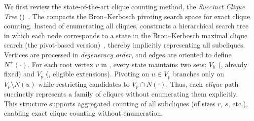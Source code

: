 We first review the state-of-the-art clique counting method, the \textit{Succinct Clique Tree} (\sct)~\cite{Pivoter}. 
The \sct compacts the Bron--Kerbosch pivoting search space for exact clique counting. 
Instead of enumerating all cliques, \sct constructs a hierarchical search tree in which each node corresponds to a state in the Bron--Kerbosch maximal clique search (the pivot-based version)~\cite{BronKerbosch,bitsetClique}, thereby implicitly representing all subcliques. 
Vertices are processed in \textit{degeneracy order}, and edges are oriented to define $N^+(\cdot)$. 
For each root vertex $v$ in \sct, every state maintains two sets: $V_h$ (\hold, already fixed) and $V_p$ (\pivot, eligible extensions). 
Pivoting on $u \in V_p$ branches only on $V_p \setminus N(u)$ while restricting candidates to $V_p \cap N(\cdot)$. 
Thus, each \textit{clique} path succinctly represents a family of cliques without enumerating them explicitly. 
This structure supports aggregated counting of all subcliques (of sizes $r$, $s$, etc.), enabling exact clique counting without enumeration.




% 

